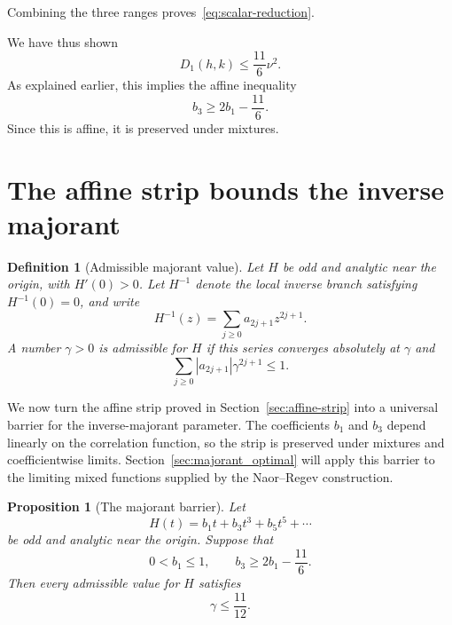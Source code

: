 \documentclass[11pt]{article}
\newtheorem{proposition}[theorem]{Proposition}
\newtheorem{definition}[theorem]{Definition}
\numberwithin{equation}{section}
\begin{document}
Combining the three ranges proves~\eqref{eq:scalar-reduction}.

We have thus shown
\[
        D_1(h,k)\le \frac{11}{6}\nu^2.
\]
As explained earlier, this implies the affine inequality
\[
        b_3\ge 2b_1-\frac{11}{6}.
\]
Since this is affine, it is preserved under mixtures.

\section{The affine strip bounds the inverse majorant}
\label{sec:strip_majorant}

\begin{definition}[Admissible majorant value]\label{def:admissible-majorant}
Let $H$ be odd and analytic near the origin, with $H'(0)>0$. Let $H^{-1}$ denote the local inverse branch satisfying $H^{-1}(0)=0$, and write
\[
        H^{-1}(z)=\sum_{j\ge0}a_{2j+1}z^{2j+1}.
\]
A number $\gamma>0$ is \emph{admissible} for $H$ if this series converges absolutely at $\gamma$ and
\[
        \sum_{j\ge0}|a_{2j+1}|\gamma^{2j+1}\le1.
\]
\end{definition}

We now turn the affine strip proved in Section~\ref{sec:affine-strip} into a universal barrier for the inverse-majorant parameter. The coefficients $b_1$ and $b_3$ depend linearly on the correlation function, so the strip is preserved under mixtures and coefficientwise limits. Section~\ref{sec:majorant_optimal} will apply this barrier to the limiting mixed functions supplied by the Naor--Regev construction.

\begin{proposition}[The majorant barrier]\label{prop:majorant-barrier}
Let
\[
        H(t)=b_1t+b_3t^3+b_5t^5+\cdots
\]
be odd and analytic near the origin. Suppose that
\[
        0<b_1\le1,
        \qquad
        b_3\ge2b_1-\frac{11}{6}.
\]
Then every admissible value for $H$ satisfies
\[
        \gamma\le\frac{11}{12}.
\]
\end{proposition}
\end{document}
